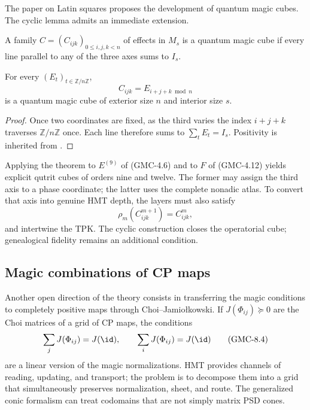 The paper on Latin squares proposes the development of quantum magic cubes.
The cyclic lemma admits an immediate extension.

\begin{definition}
A family
$C=(C_{ijk})_{0\le i,j,k<n}$ of effects in $M_s$ is a quantum magic cube
if every line parallel to any of the three axes sums to $I_s$.
\end{definition}

\begin{theorem}
\label{p12-83-c22-s5:gmc:thm:cubo-ciclico}
For every \POVM $(E_t)_{t\in\mathbb Z/n\mathbb Z}$,
\[
 C_{ijk}=E_{i+j+k\bmod n}
 \tag{GMC-8.2}
\]
is a quantum magic cube of exterior size $n$ and interior size $s$.
\end{theorem}

\begin{proof}
Once two coordinates are fixed, as the third varies the index
$i+j+k$ traverses $\mathbb Z/n\mathbb Z$ once. Each line therefore sums to
$\sum_tE_t=I_s$. Positivity is inherited from \POVM.
\end{proof}

Applying the theorem to $E^{(9)}$ of \textup{(GMC-4.6)} and to $F$ of
\textup{(GMC-4.12)} yields explicit qutrit cubes of orders nine and twelve. The
former may assign the third axis to a phase coordinate; the latter uses the
complete nonadic atlas. To convert that axis into genuine HMT depth,
the layers must also satisfy
\[
 \rho_m(C^{m+1}_{ijk})=C^m_{ijk},
 \tag{GMC-8.3}
\]
and intertwine the TPK. The cyclic construction closes the operatorial cube;
genealogical fidelity remains an additional condition.

\subsection{Magic combinations of CP maps}

Another open direction of the theory consists in transferring the magic conditions
to completely positive maps through Choi--Jamiołkowski. If
$J(\Phi_{ij})\succeq0$ are the Choi matrices of a grid of CP maps,
the conditions
\[
 \sum_jJ(\Phi_{ij})=J(\id),
 \qquad
 \sum_iJ(\Phi_{ij})=J(\id)
 \tag{GMC-8.4}
\]
are a linear version of the magic normalizations. HMT provides channels of
reading, updating, and transport; the problem is to decompose them into a
grid that simultaneously preserves normalization, sheet, and route. The generalized
conic formalism can treat codomains that are not simply matrix
PSD cones.

